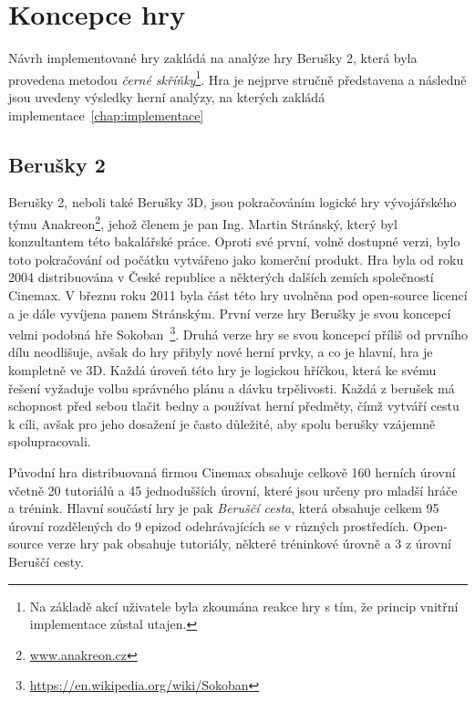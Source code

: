 \chapter{Koncepce hry}
\label{chap:analysis}
Návrh implementované hry zakládá na analýze hry Berušky 2, která byla provedena metodou \textit{černé skříňky}\footnote{Na základě akcí uživatele byla zkoumána reakce hry s tím, že princip vnitřní implementace zůstal utajen.}. Hra je nejprve stručně představena a následně jsou uvedeny výsledky herní analýzy, na kterých zakládá implementace~\ref{chap:implementace}

\section{Berušky 2}
Berušky 2, neboli také Berušky 3D, jsou pokračováním logické hry vývojářského týmu Anakreon\footnote{\url{www.anakreon.cz}}, jehož členem je pan Ing. Martin Stránský, který byl konzultantem této bakalářské práce. Oproti své první, volně dostupné verzi, bylo toto pokračování od počátku vytvářeno jako komerční produkt. Hra byla od roku 2004 distribuována v České republice a některých dalších zemích společností Cinemax. V březnu roku 2011 byla část této hry uvolněna pod open-source licencí a je dále vyvíjena panem Stránským. První verze hry Berušky je svou koncepcí velmi podobná hře Sokoban~\footnote{\url{https://en.wikipedia.org/wiki/Sokoban}}. Druhá verze hry se svou koncepcí příliš od prvního dílu neodlišuje, avšak do hry přibyly nové herní prvky, a co je hlavní, hra je kompletně ve 3D. Každá úroveň této hry je logickou hříčkou, která ke svému řešení vyžaduje volbu správného plánu a dávku trpělivosti. Každá z berušek má schopnost před sebou tlačit bedny a používat herní předměty, čímž vytváří cestu k cíli, avšak pro jeho dosažení je často důležité, aby spolu berušky vzájemně spolupracovali.

Původní hra distribuovaná firmou Cinemax obsahuje celkově 160 herních úrovní včetně 20 tutoriálů a 45 jednodušších úrovní, které jsou určeny pro mladší hráče a trénink. Hlavní součástí hry je pak \textit{Beruščí cesta}, která obsahuje celkem 95 úrovní rozdělených do 9 epizod odehrávajících se v různých prostředích. Open-source verze hry pak obsahuje tutoriály, některé tréninkové úrovně a 3 z úrovní Beruščí cesty.

